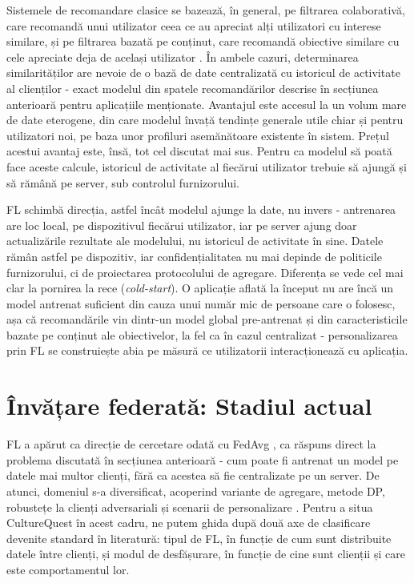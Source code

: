 \documentclass[12pt,a4paper]{report}
\begin{document}
Sistemele de recomandare clasice se bazează, în general, pe filtrarea colaborativă, care recomandă unui utilizator ceea ce au apreciat alți utilizatori cu interese similare, și pe filtrarea bazată pe conținut, care recomandă obiective similare cu cele apreciate deja de același utilizator \cite{adomavicius2005recommender}. În ambele cazuri, determinarea similarităților are nevoie de o bază de date centralizată cu istoricul de activitate al clienților - exact modelul din spatele recomandărilor descrise în secțiunea anterioară pentru aplicațiile menționate. Avantajul este accesul la un volum mare de date eterogene, din care modelul învață tendințe generale utile chiar și pentru utilizatori noi, pe baza unor profiluri asemănătoare existente în sistem. Prețul acestui avantaj este, însă, tot cel discutat mai sus. Pentru ca modelul să poată face aceste calcule, istoricul de activitate al fiecărui utilizator trebuie să ajungă și să rămână pe server, sub controlul furnizorului.

FL schimbă direcția, astfel încât modelul ajunge la date, nu invers - antrenarea are loc local, pe dispozitivul fiecărui utilizator, iar pe server ajung doar actualizările rezultate ale modelului, nu istoricul de activitate în sine. Datele rămân astfel pe dispozitiv, iar confidențialitatea nu mai depinde de politicile furnizorului, ci de proiectarea protocolului de agregare. Diferența se vede cel mai clar la pornirea la rece (\textit{cold-start}). O aplicație aflată la început nu are încă un model antrenat suficient din cauza unui număr mic de persoane care o folosesc, așa că recomandările vin dintr-un model global pre-antrenat și din caracteristicile bazate pe conținut ale obiectivelor, la fel ca în cazul centralizat - personalizarea prin FL se construiește abia pe măsură ce utilizatorii interacționează cu aplicația.

\section{Învățare federată: Stadiul actual}

FL a apărut ca direcție de cercetare odată cu FedAvg \cite{mcmahan2017fedavg}, ca răspuns direct la problema discutată în secțiunea anterioară - cum poate fi antrenat un model pe datele mai multor clienți, fără ca acestea să fie centralizate pe un server. De atunci, domeniul s-a diversificat, acoperind variante de agregare, metode DP, robustețe la clienți adversariali și scenarii de personalizare \cite{kairouz2021advances}. Pentru a situa CultureQuest în acest cadru, ne putem ghida după două axe de clasificare devenite standard în literatură: tipul de FL, în funcție de cum sunt distribuite datele între clienți, și modul de desfășurare, în funcție de cine sunt clienții și care este comportamentul lor.
\end{document}
